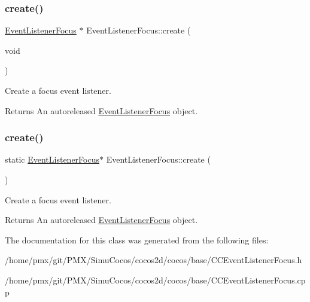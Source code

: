 \subsubsection{\texorpdfstring{create()}{create()}\hspace{0.1cm}{\footnotesize\ttfamily [1/2]}}
{\footnotesize\ttfamily \hyperlink{classEventListenerFocus}{Event\+Listener\+Focus} $\ast$ Event\+Listener\+Focus\+::create (\begin{DoxyParamCaption}\item[{void}]{ }\end{DoxyParamCaption})\hspace{0.3cm}{\ttfamily [static]}}

Create a focus event listener.

\begin{DoxyReturn}{Returns}
An autoreleased \hyperlink{classEventListenerFocus}{Event\+Listener\+Focus} object. 
\end{DoxyReturn}
\mbox{\label{classEventListenerFocus_a7f998e020c71c6885a587781f17a4236}} 
\subsubsection{\texorpdfstring{create()}{create()}\hspace{0.1cm}{\footnotesize\ttfamily [2/2]}}
{\footnotesize\ttfamily static \hyperlink{classEventListenerFocus}{Event\+Listener\+Focus}$\ast$ Event\+Listener\+Focus\+::create (\begin{DoxyParamCaption}{ }\end{DoxyParamCaption})\hspace{0.3cm}{\ttfamily [static]}}

Create a focus event listener.

\begin{DoxyReturn}{Returns}
An autoreleased \hyperlink{classEventListenerFocus}{Event\+Listener\+Focus} object. 
\end{DoxyReturn}


The documentation for this class was generated from the following files\+:\begin{DoxyCompactItemize}
\item 
/home/pmx/git/\+P\+M\+X/\+Simu\+Cocos/cocos2d/cocos/base/C\+C\+Event\+Listener\+Focus.\+h\item 
/home/pmx/git/\+P\+M\+X/\+Simu\+Cocos/cocos2d/cocos/base/C\+C\+Event\+Listener\+Focus.\+cpp\end{DoxyCompactItemize}
